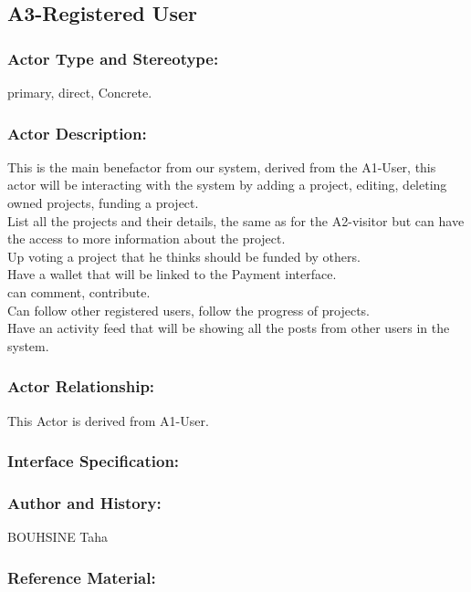 \documentclass[11pt, openany]{report}
\begin{document}
\clearpage

\subsection{A3-Registered User}
\label{A3}
\subsubsection{Actor Type and Stereotype:}
primary, direct, Concrete.
\subsubsection{Actor Description:}
This is the main benefactor from our system, derived from the A1-User, this actor will be interacting with the system by adding a project, editing, deleting owned projects, funding a project.\\
List all the projects and their details, the same as for the A2-visitor but can have the access to more information about the project.\\
Up voting a project that he thinks should be funded by others.\\
Have a wallet that will be linked to the Payment interface.\\
can comment, contribute.\\
Can follow other registered users, follow the progress of projects.\\
Have an activity feed that will be showing all the posts from other users in the system.
\subsubsection{Actor Relationship:}
This Actor is derived from A1-User.
\subsubsection{Interface Specification:}
\subsubsection{Author and History:}
BOUHSINE Taha
\subsubsection{Reference Material:}
\end{document}
